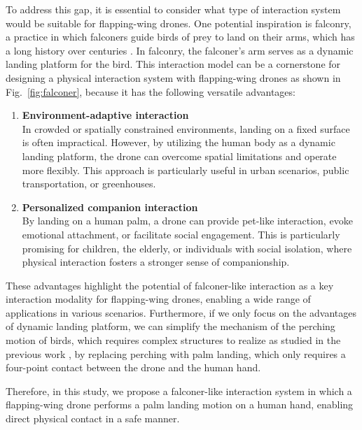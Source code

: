 To address this gap, it is essential to consider what type of interaction system would be suitable for flapping-wing drones.
One potential inspiration is falconry, a practice in which falconers guide birds of prey to land on their arms, which has a long history over centuries \cite{oggins2019falconry}.
In falconry, the falconer's arm serves as a dynamic landing platform for the bird.
This interaction model can be a cornerstone for designing a physical interaction system with flapping-wing drones as shown in Fig.~\ref{fig:falconer}, 
because it has the following versatile advantages:
\begin{enumerate}
    \item \textbf{Environment-adaptive interaction}\\  
    In crowded or spatially constrained environments, landing on a fixed surface is often impractical.  
    However, by utilizing the human body as a dynamic landing platform, the drone can overcome spatial limitations and operate more flexibly.  
    This approach is particularly useful in urban scenarios, public transportation, or greenhouses.
    \item \textbf{Personalized companion interaction}\\  
    By landing on a human palm, a drone can provide pet-like interaction, evoke emotional attachment, or facilitate social engagement.  
    This is particularly promising for children, the elderly, or individuals with social isolation, where physical interaction fosters a stronger sense of companionship.
\end{enumerate}
These advantages highlight the potential of falconer-like interaction as a key interaction modality for flapping-wing drones, enabling a wide range of applications in various scenarios.
Furthermore, if we only focus on the advantages of dynamic landing platform, we can simplify the mechanism of the perching motion of birds, which requires complex structures to realize as studied in the previous work \cite{roderick2021bird-inspired-perching},
by replacing perching with palm landing, which only requires a four-point contact between the drone and the human hand.

Therefore, in this study, we propose a falconer-like interaction system in which a flapping-wing drone performs a palm landing motion on a human hand, enabling direct physical contact in a safe manner.

